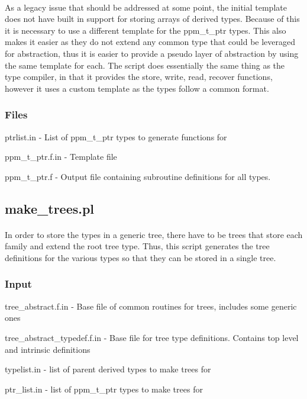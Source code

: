 \documentclass{article}
\begin{document}
\paragraph{}
As a legacy issue that should be addressed at some point, the initial template does not have built in support for storing arrays of derived types. Because of this it is necessary to use a different template for the ppm\_t\_ptr types. This also makes it easier as they do not extend any common type that could be leveraged for abstraction, thus it is easier to provide a pseudo layer of abstraction by using the same template for each. The script does essentially the same thing as the type compiler, in that it provides the store, write, read, recover functions, however it uses a custom template as the types follow a common format.
\subsubsection{Files}
\begin{list}{}{}
\item ptrlist.in - List of ppm\_t\_ptr types to generate functions for
\item ppm\_t\_ptr.f.in - Template file
\item ppm\_t\_ptr.f - Output file containing subroutine definitions for all types.
\end{list}

\subsection{make\_trees.pl}
\label{sec:make_trees}
\paragraph{}
In order to store the types in a generic tree, there have to be trees that store each family and extend the root tree type. Thus, this script generates the tree definitions for the various types so that they can be stored in a single tree.
\subsubsection{Input}
\begin{list}{}{}
\item tree\_abstract.f.in - Base file of common routines for trees, includes some generic ones
\item tree\_abstract\_typedef.f.in - Base file for tree type definitions. Contains top level and intrinsic definitions
\item typelist.in - list of parent derived types to make trees for
\item ptr\_list.in - list of ppm\_t\_ptr types to make trees for
\end{list}
\end{document}

